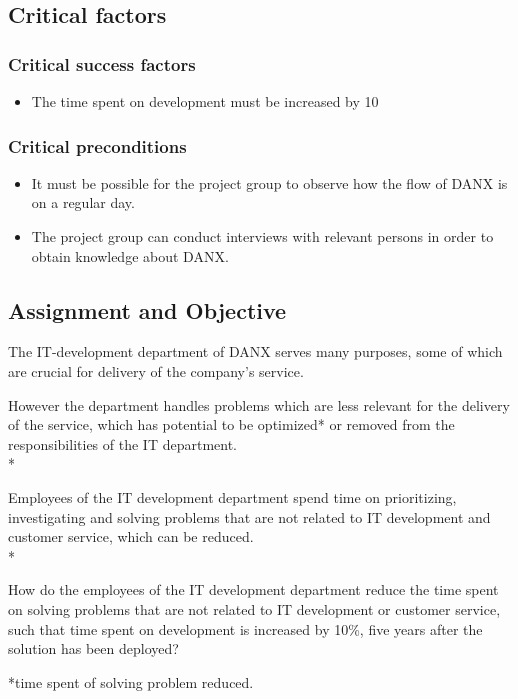 \subsection{Critical factors}
\subsubsection{Critical success factors}
\begin{itemize}
	\item The time spent on development must be increased by 10%
	\end{itemize}

\subsubsection{Critical preconditions}
\begin{itemize}
	\item It must be possible for the project group to observe how the flow of DANX is on a regular day.
	\item The project group can conduct interviews with relevant persons in order to obtain knowledge about DANX.
	\end{itemize}

\subsection{Assignment and Objective}
The IT-development department of DANX serves many purposes, some of which are crucial for delivery of the company’s service.

However the department handles problems which are less relevant for the delivery of the service, which has potential to be optimized* or removed from the responsibilities of the IT department. \\*

Employees of the IT development department spend time on prioritizing, investigating and solving problems that are not related to IT development and customer service, which can be reduced. \\*

How do the employees of the IT development department reduce the time spent on solving problems that are not related to IT development or customer service, such that time spent on development is increased by 10\%, five years after the solution has been deployed?

\small{*time spent of solving problem reduced.}\\

